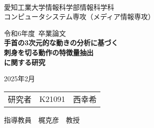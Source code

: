 \begin{titlepage}

\ \\
\begin{center}

{\LARGE 愛知工業大学情報科学部情報科学科\\
コンピュータシステム専攻（メディア情報専攻）

\vspace{1.0cm}

令和6年度~卒業論文\\

\vspace{2.0cm}
{\Huge
\baselineskip=15mm
\textbf{手首の3次元的な動きの分析に基づく\\
刺身を切る動作の特徴量抽出\\に関する研究\\}}

\vspace{7.0cm}

2025年2月\\

\vspace{1.0cm}

\begin{tabular}[h]{lll}
  研究者  & K21091 & 西幸希\\
\end{tabular}

\vspace{1.0cm}

指導教員\ \ 梶克彦\ \ 教授}

\end{center}

\end{titlepage}
